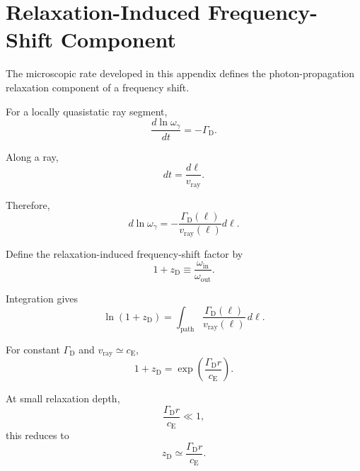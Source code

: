 \section{Relaxation-Induced Frequency-Shift Component}

The microscopic rate developed in this appendix defines the
photon-propagation relaxation component of a frequency shift.

For a locally quasistatic ray segment,
\begin{equation}
    \frac{
        d\ln\omega_{\gamma}
    }{
        dt
    }
    =
    -\Gamma_{\mathrm D}.
    \label{eq:AQ_local_relaxation}
\end{equation}

Along a ray,
\begin{equation}
    dt
    =
    \frac{
        d\ell
    }{
        v_{\mathrm{ray}}
    }.
\end{equation}

Therefore,
\begin{equation}
    d\ln\omega_{\gamma}
    =
    -
    \frac{
        \Gamma_{\mathrm D}(\ell)
    }{
        v_{\mathrm{ray}}(\ell)
    }
    d\ell.
\end{equation}

Define the relaxation-induced frequency-shift factor by
\begin{equation}
    \boxed{
    1+z_{\mathrm D}
    \equiv
    \frac{
        \omega_{\mathrm{in}}
    }{
        \omega_{\mathrm{out}}
    }.
    }
    \label{eq:AQ_zD_def}
\end{equation}

Integration gives
\begin{equation}
    \boxed{
    \ln(1+z_{\mathrm D})
    =
    \int_{\mathrm{path}}
    \frac{
        \Gamma_{\mathrm D}(\ell)
    }{
        v_{\mathrm{ray}}(\ell)
    }
    \,d\ell.
    }
    \label{eq:AQ_zD_general}
\end{equation}

For constant $\Gamma_{\mathrm D}$ and
$v_{\mathrm{ray}}\simeq c_{\mathrm E}$,
\begin{equation}
    \boxed{
    1+z_{\mathrm D}
    =
    \exp
    \left(
        \frac{
            \Gamma_{\mathrm D}r
        }{
            c_{\mathrm E}
        }
    \right).
    }
    \label{eq:AQ_zD_constant}
\end{equation}

At small relaxation depth,
\begin{equation}
    \frac{
        \Gamma_{\mathrm D}r
    }{
        c_{\mathrm E}
    }
    \ll1,
\end{equation}
this reduces to
\begin{equation}
    \boxed{
    z_{\mathrm D}
    \simeq
    \frac{
        \Gamma_{\mathrm D}r
    }{
        c_{\mathrm E}
    }.
    }
    \label{eq:AQ_zD_low}
\end{equation}

